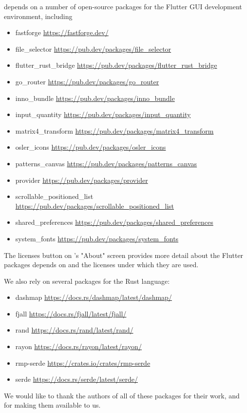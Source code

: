 \homot depends on a number of open-source packages for the Flutter {GUI} development environment, including 
\begin{itemize}
  \item{fastforge \url{https://fastforge.dev/}}
  \item{file\_selector \url{https://pub.dev/packages/file\_selector}}
  \item{flutter\_rust\_bridge \url{https://pub.dev/packages/flutter\_rust\_bridge}}
  \item{go\_router \url{https://pub.dev/packages/go\_router}}
  \item{inno\_bundle \url{https://pub.dev/packages/inno\_bundle}}
  \item{input\_quantity \url{https://pub.dev/packages/input\_quantity}}
  \item{matrix4\_transform \url{https://pub.dev/packages/matrix4\_transform}}
  \item{osler\_icons \url{https://pub.dev/packages/osler\_icons}}
  \item{patterns\_canvas \url{https://pub.dev/packages/patterns\_canvas}}
  \item{provider \url{https://pub.dev/packages/provider}}
  \item{scrollable\_positioned\_list \url{https://pub.dev/packages/scrollable\_positioned\_list}}
  \item{shared\_preferences \url{https://pub.dev/packages/shared\_preferences}}
  \item{system\_fonts \url{https://pub.dev/packages/system\_fonts}}
\end{itemize}

The licenses button on \homot's "About" screen provides more detail about the Flutter packages \homot depends on and the licenses under which they are used.

We also rely on several packages for the Rust language:
\begin{itemize}
\item{dashmap \url{https://docs.rs/dashmap/latest/dashmap/}}
\item{fjall \url{https://docs.rs/fjall/latest/fjall/}} 
\item{rand \url{https://docs.rs/rand/latest/rand/}}
\item{rayon \url{https://docs.rs/rayon/latest/rayon/}}
\item{rmp-serde \url{https://crates.io/crates/rmp-serde}}
\item{serde \url{https://docs.rs/serde/latest/serde/}}
\end{itemize}

We would like to thank the authors of all of these packages for their work, and for making them available to us.